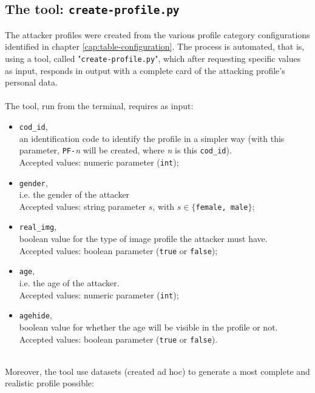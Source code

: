 \subsection{The tool: \texttt{create-profile.py}}
\label{cap:tool-create}
The attacker profiles were created from the various profile category configurations identified in chapter \ref{cap:table-configuration}. The process is automated, that is, using a tool, called "\texttt{create-profile.py}", which after requesting specific values as input, responds in output with a complete card of the attacking profile's personal data.
\\\\\noindent The tool, run from the terminal, requires as input:
\begin{itemize}
	\item \texttt{cod\_id},\\an identification code to identify the profile in a simpler way (with this parameter, \texttt{PF-}\textit{n} will be created, where \textit{n} is this \texttt{cod\_id}).\\Accepted values: numeric parameter (\texttt{int});
	
	\item \texttt{gender},\\i.e. the gender of the attacker\\Accepted values: string parameter $s$, with $s \in \{$\texttt{female, male}$\}$;
	
	\item \texttt{real\_img},\\boolean value for the type of image profile the attacker must have.\\Accepted values: boolean parameter (\texttt{true} or \texttt{false});
	
	\item \texttt{age},\\i.e. the age of the attacker.\\Accepted values: numeric parameter (\texttt{int});
	
	\item \texttt{agehide},\\boolean value for whether the age will be visible in the profile or not.\\Accepted values: boolean parameter (\texttt{true} or \texttt{false}).
\end{itemize}
\noindent \\ Moreover, the tool use datasets (created ad hoc) to generate a most complete and realistic profile possible:
